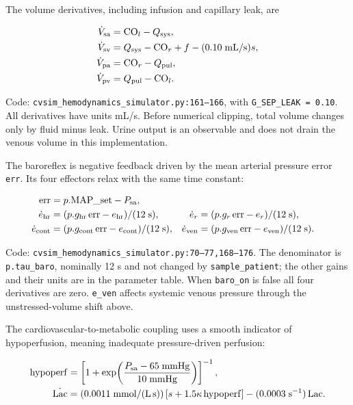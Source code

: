 The volume derivatives, including infusion and capillary leak, are

\[
\begin{aligned}
\dot V_{\rm sa}&=\mathrm{CO}_l-Q_{\rm sys},\\
\dot V_{\rm sv}&=Q_{\rm sys}-\mathrm{CO}_r+f-(0.10\;\mathrm{mL/s})s,\\
\dot V_{\rm pa}&=\mathrm{CO}_r-Q_{\rm pul},\\
\dot V_{\rm pv}&=Q_{\rm pul}-\mathrm{CO}_l.
\end{aligned}
\]


Code: \texttt{cvsim\_\allowbreak{}hemodynamics\_\allowbreak{}simulator.\allowbreak{}py:\allowbreak{}161–\allowbreak{}166}, with \texttt{G\_\allowbreak{}SEP\_\allowbreak{}LEAK =\allowbreak{} 0.\allowbreak{}10}. All derivatives have units mL/s. Before numerical clipping, total volume changes only by fluid minus leak. Urine output is an observable and does not drain the venous volume in this implementation.

The baroreflex is negative feedback driven by the mean arterial pressure error \texttt{err}. Its four effectors relax with the same time constant:

\[
\begin{aligned}
\mathrm{err}&=p.\mathrm{MAP\_set}-P_{\rm sa},\\
\dot e_{\rm hr}&=(p.g_{\rm hr}\,\mathrm{err}-e_{\rm hr})/(12\;\mathrm{s}),&
\dot e_r&=(p.g_r\,\mathrm{err}-e_r)/(12\;\mathrm{s}),\\
\dot e_{\rm cont}&=(p.g_{\rm cont}\,\mathrm{err}-e_{\rm cont})/(12\;\mathrm{s}),&
\dot e_{\rm ven}&=(p.g_{\rm ven}\,\mathrm{err}-e_{\rm ven})/(12\;\mathrm{s}).
\end{aligned}
\]


Code: \texttt{cvsim\_\allowbreak{}hemodynamics\_\allowbreak{}simulator.\allowbreak{}py:\allowbreak{}70–\allowbreak{}77,\allowbreak{}168–\allowbreak{}176}. The denominator is \texttt{p.\allowbreak{}tau\_\allowbreak{}baro}, nominally 12 s and not changed by \texttt{sample\_\allowbreak{}patient}; the other gains and their units are in the parameter table. When \texttt{baro\_\allowbreak{}on} is false all four derivatives are zero. \texttt{e\_\allowbreak{}ven} affects systemic venous pressure through the unstressed-volume shift above.

The cardiovascular-to-metabolic coupling uses a smooth indicator of hypoperfusion, meaning inadequate pressure-driven perfusion:

\[
\begin{aligned}
\mathrm{hypoperf}&=\left[1+\exp\!\left(\frac{P_{\rm sa}-65\;\mathrm{mmHg}}{10\;\mathrm{mmHg}}\right)\right]^{-1},\\
\dot{\mathrm{Lac}}&=(0.0011\;\mathrm{mmol/(L\,s)})\,[s+1.5\kappa\,\mathrm{hypoperf}]
 -(0.0003\;\mathrm{s}^{-1})\,\mathrm{Lac}.
\end{aligned}
\]


